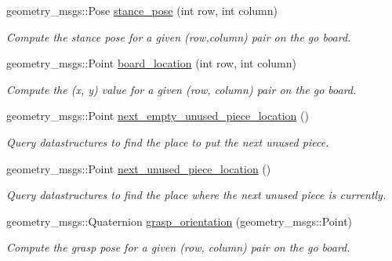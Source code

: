 \begin{DoxyCompactItemize}
geometry\+\_\+msgs\+::\+Pose \hyperlink{classgo__motion__planner_a2120e26233b9622d9af923f7649b73fe}{stance\+\_\+pose} (int row, int column)
\begin{DoxyCompactList}\small\item\em Compute the stance pose for a given (row,column) pair on the go board. \end{DoxyCompactList}\item 
geometry\+\_\+msgs\+::\+Point \hyperlink{classgo__motion__planner_a26ec310b72222bc827f595e94ada0719}{board\+\_\+location} (int row, int column)
\begin{DoxyCompactList}\small\item\em Compute the (x, y) value for a given (row, column) pair on the go board. \end{DoxyCompactList}\item 
\mbox{\label{classgo__motion__planner_a7ca51ab871bab4e80b208587b1c8ee45}} 
geometry\+\_\+msgs\+::\+Point \hyperlink{classgo__motion__planner_a7ca51ab871bab4e80b208587b1c8ee45}{next\+\_\+empty\+\_\+unused\+\_\+piece\+\_\+location} ()
\begin{DoxyCompactList}\small\item\em Query datastructures to find the place to put the next unused piece. \end{DoxyCompactList}\item 
\mbox{\label{classgo__motion__planner_ac70899ea0cb646a112c51f9a056fa4b1}} 
geometry\+\_\+msgs\+::\+Point \hyperlink{classgo__motion__planner_ac70899ea0cb646a112c51f9a056fa4b1}{next\+\_\+unused\+\_\+piece\+\_\+location} ()
\begin{DoxyCompactList}\small\item\em Query datastructures to find the place where the next unused piece is currently. \end{DoxyCompactList}\item 
geometry\+\_\+msgs\+::\+Quaternion \hyperlink{classgo__motion__planner_aa8f5de4110bd29391e00b26eda2a5bcc}{grasp\+\_\+orientation} (geometry\+\_\+msgs\+::\+Point)
\begin{DoxyCompactList}\small\item\em Compute the grasp pose for a given (row, column) pair on the go board. \end{DoxyCompactList}\item 
\mbox{\label{classgo__motion__planner_a88298290e78a2b4445d7026785d04760}} 

\end{DoxyCompactItemize}

